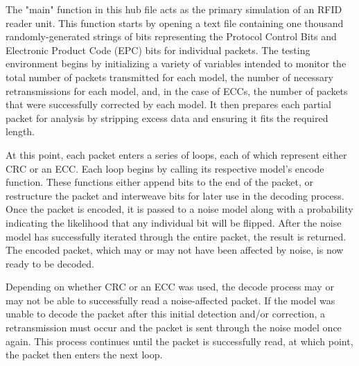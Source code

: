 \documentclass{sigcomm-alternate}
\begin{document}
The "main" function in this hub file acts as the primary simulation of an RFID reader unit. This function starts by opening a text file containing one thousand randomly-generated strings of bits representing the Protocol Control Bits and Electronic Product Code (EPC) bits for individual packets. The testing environment begins by initializing a variety of variables intended to monitor the total number of packets transmitted for each model, the number of necessary retransmissions for each model, and, in the case of ECCs, the number of packets that were successfully corrected by each model. It then prepares each partial packet for analysis by stripping excess data and ensuring it fits the required length.

 At this point, each packet enters a series of loops, each of which represent either CRC or an ECC. Each loop begins by calling its respective model's encode function. These functions either append bits to the end of the packet, or restructure the packet and interweave bits for later use in the decoding process. Once the packet is encoded, it is passed to a noise model along with a probability indicating the likelihood that any individual bit will be flipped. After the noise model has successfully iterated through the entire packet, the result is returned. The encoded packet, which may or may not have been affected by noise, is now ready to be decoded.
 
Depending on whether CRC or an ECC was used, the decode process may or may not be able to successfully read a noise-affected packet. If the model was unable to decode the packet after this initial detection and/or correction, a retransmission must occur and the packet is sent through the noise model once again. This process continues until the packet is successfully read, at which point, the packet then enters the next loop.
\end{document}
